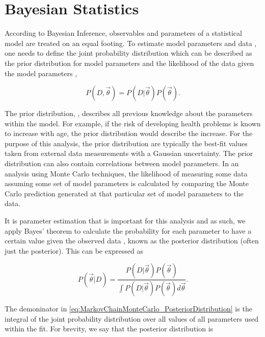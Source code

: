 \section{Bayesian Statistics}
\label{sec:MarkovChainMonteCarlo_BayesianStatistics}
According to Bayesian Inference, observables and parameters of a statistical model are treated on an equal footing. To estimate model parameters \quickmath{\vec{\theta}} and data , one needs to define the joint probability distribution  which can be described as the prior distribution for model parameters  and the likelihood of the data given the model parameters ,

\begin{equation}
  P(D,\vec{\theta}) = P(D|\vec{\theta})P(\vec{\theta}).
\end{equation}

The prior distribution, , describes all previous knowledge about the parameters within the model. For example, if the risk of developing health problems is known to increase with age, the prior distribution would describe the increase. For the purpose of this analysis, the prior distribution are typically the best-fit values taken from external data measurements with a Gaussian uncertainty. The prior distribution can also contain correlations between model parameters. In an analysis using Monte Carlo techniques, the likelihood of measuring some data assuming some set of model parameters is calculated by comparing the Monte Carlo prediction generated at that particular set of model parameters to the data.

It is parameter estimation that is important for this analysis and as such, we apply Bayes' theorem \cite{Bayes:1764vd} to calculate the probability for each parameter to have a certain value given the observed data , known as the posterior distribution (often just the posterior). This can be expressed as

\begin{equation}
  \label{eq:MarkovChainMonteCarlo_PosteriorDistribution}
  P(\vec{\theta}|D) = \frac{ P(D|\vec{\theta}) P(\vec{\theta}) }{\int P(D|\vec{\theta}) P(\vec{\theta}) d\vec{\theta}}.
\end{equation}

The demoninator in \autoref{eq:MarkovChainMonteCarlo_PosteriorDistribution} is the integral of the joint probability distribution over all values of all parameters used within the fit. For brevity, we say that the posterior distribution is

